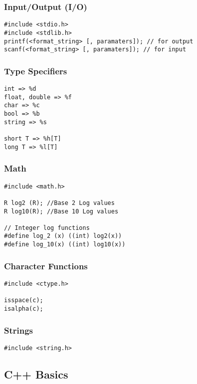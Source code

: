 \subsubsection{Input/Output (I/O)}
\begin{lstlisting}[style=CStyle]
#include <stdio.h>
#include <stdlib.h>
printf(<format_string> [, paramaters]); // for output
scanf(<format_string> [, paramaters]); // for input
\end{lstlisting}

\subsubsection{Type Specifiers}
\begin{lstlisting}[style=CStyle]
int => %d
float, double => %f
char => %c
bool => %b
string => %s

short T => %h[T]
long T => %l[T]
\end{lstlisting}

\subsubsection{Math}
\begin{lstlisting}[style=CStyle]
#include <math.h>

R log2 (R); //Base 2 Log values
R log10(R); //Base 10 Log values

// Integer log functions
#define log_2 (x) ((int) log2(x))
#define log_10(x) ((int) log10(x))
\end{lstlisting}

\subsubsection{Character Functions}
\begin{lstlisting}[style=CStyle]
#include <ctype.h>

isspace(c);
isalpha(c);
\end{lstlisting}

\subsubsection{Strings}
\begin{lstlisting}[style=CStyle]
#include <string.h>

\end{lstlisting}

\subsection{C++ Basics}

